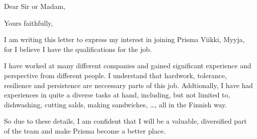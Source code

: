 \documentclass[11pt,a4paper,sans]{moderncv}
\begin{document}
  \clearpage
  \date{March 15, 2020}
  \opening{Dear Sir or Madam,}
  \closing{Yours faithfully,}
  \makelettertitle

  I am writing this letter to express my interest in joining Prisma Viikki,
  Myyja, for
  I believe I have the qualifications for the job.

  I have worked at many different companies and gained significant experience and perspective
  from different people. I understand that hardwork, tolerance, resilience and persistence
  are neccessary parts of this job. Addtionally, I have had experiences in quite
  a diverse tasks at hand, including, but not limited to, dishwashing, cutting
  salds, making sandwiches, \ldots, all in the Finnish way.

  So due to these details, I am confident that I will be a valuable, diversified
  part of the team and make Prisma become a better place.

  \makeletterclosing
\end{document}
